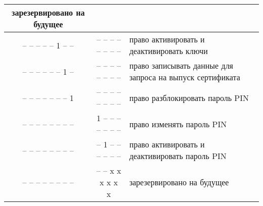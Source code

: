 \begin{table}[h!]
\begin{tabular}{|c|c|p{9cm}|}
зарезервировано на будущее\\ 
\hline 
– \hspace{0.075cm} – \hspace{0.075cm} – \hspace{0.075cm} – 
\hspace{0.075cm} – \hspace{0.075cm} 1 – – &  –  –  –  –  –  –  –  – & 
право активировать и деактивировать ключи \\ 
\hline 
– \hspace{0.075cm} – \hspace{0.075cm} – \hspace{0.075cm} – 
\hspace{0.075cm} – \hspace{0.075cm}  – 1 – &  –  –  –  –  –  –  –  – & 
право записывать данные для запроса на выпуск сертификата\\ 
\hline 
– \hspace{0.075cm} – \hspace{0.075cm} – \hspace{0.075cm} – 
\hspace{0.075cm} – \hspace{0.075cm}  – – 1 &  –  –  –  –  –  –  –  – & 
право разблокировать пароль PIN\\ 
\hline 
– \hspace{0.075cm} – \hspace{0.075cm} – \hspace{0.075cm} – 
\hspace{0.075cm} – \hspace{0.075cm}  – – – &  1  –  –  –  –  –  –  – & 
право изменять пароль PIN\\ 
\hline 
– \hspace{0.075cm} – \hspace{0.075cm} – \hspace{0.075cm} – 
\hspace{0.075cm} – \hspace{0.075cm}  – – – &   –  1 – –  –  –  –  – & 
право активировать и деактивировать пароль PIN\\ 
\hline 
– \hspace{0.075cm} – \hspace{0.075cm} – \hspace{0.075cm} – 
\hspace{0.075cm} – \hspace{0.075cm} – – – &  –  –  x  x  x  x  x  x & 
зарезервировано на будущее\\ 
\hline 
\end{tabular}
\end{table}


